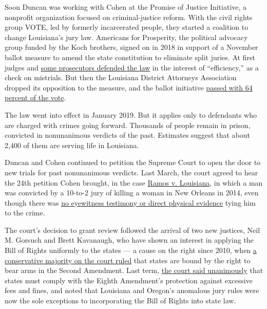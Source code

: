 Soon Duncan was working with Cohen at the Promise of Justice Initiative,
a nonprofit organization focused on criminal-justice reform. With the
civil rights group VOTE, led by formerly incarcerated people, they
started a coalition to change Louisiana's jury law. Americans for
Prosperity, the political advocacy group funded by the Koch brothers,
signed on in 2018 in support of a November ballot measure to amend the
state constitution to eliminate split juries. At first judges and
\href{https://www.nola.com/news/courts/article_8e284de1-9c5c-5d77-bcc5-6e22a3053aa0.html}{some
prosecutors defended the law} in the interest of ``efficiency,'' as a
check on mistrials. But then the Louisiana District Attorneys
Association dropped its opposition to the measure, and the ballot
initiative
\href{https://www.nola.com/news/politics/article_e36481c9-b8be-5f80-a11e-46daee2d3974.html}{passed
with 64 percent of the vote}.

The law went into effect in January 2019. But it applies only to
defendants who are charged with crimes going forward. Thousands of
people remain in prison, convicted in nonunanimous verdicts of the past.
Estimates suggest that about 2,400 of them are serving life in
Louisiana.

Duncan and Cohen continued to petition the Supreme Court to open the
door to new trials for past nonunanimous verdicts. Last March, the court
agreed to hear the 24th petition Cohen brought, in the case
\href{https://www.scotusblog.com/case-files/cases/ramos-v-louisiana/}{Ramos
v. Louisiana}, in which a man was convicted by a 10-to-2 jury of killing
a woman in New Orleans in 2014, even though there was
\href{https://www.supremecourt.gov/DocketPDF/18/18-5924/73345/20181127123743863_18.5924.Ramos.Louisiana.Reply.pdf}{no
eyewitness testimony or direct physical evidence} tying him to the
crime.

The court's decision to grant review followed the arrival of two new
justices, Neil M. Gorsuch and Brett Kavanaugh, who have shown an
interest in applying the Bill of Rights uniformly to the states --- a
cause on the right since 2010, when
\href{https://www.oyez.org/cases/2009/08-1521}{a conservative majority
on the court ruled} that states are bound by the right to bear arms in
the Second Amendment. Last term,
\href{https://www.supremecourt.gov/opinions/18pdf/17-1091_5536.pdf}{the
court said unanimously} that states must comply with the Eighth
Amendment's protection against excessive fees and fines, and noted that
Louisiana and Oregon's anomalous jury rules were now the sole exceptions
to incorporating the Bill of Rights into state law.

